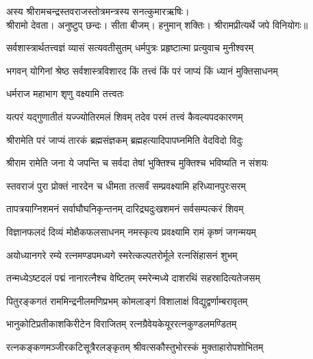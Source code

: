 
अस्य श्रीरामचन्द्रस्तवराजस्तोत्रमन्त्रस्य सनत्कुमारऋषिः। \\
श्रीरामो देवता। अनुष्टुप् छन्दः। सीता बीजम्। हनुमान् शक्तिः। 
श्रीरामप्रीत्यर्थे जपे विनियोगः॥


\twolineshloka
{सर्वशास्त्रार्थतत्त्वज्ञं व्यासं सत्यवतीसुतम्}
{धर्मपुत्रः प्रहृष्टात्मा प्रत्युवाच मुनीश्वरम्}%


\twolineshloka
{भगवन् योगिनां श्रेष्ठ सर्वशास्त्रविशारद}
{किं तत्त्वं किं परं जाप्यं किं ध्यानं मुक्तिसाधनम्}%


\onelineshloka
{धर्मराज महाभाग शृणु वक्ष्यामि तत्त्वतः}%

\twolineshloka
{यत्परं यद्गुणातीतं यज्ज्योतिरमलं शिवम्}
{तदेव परमं तत्त्वं कैवल्यपदकारणम्}%

\twolineshloka
{श्रीरामेति परं जाप्यं तारकं ब्रह्मसंज्ञकम्}
{ब्रह्महत्यादिपापघ्नमिति वेदविदो विदुः}%

\twolineshloka
{श्रीराम रामेति जना ये जपन्ति च सर्वदा}
{तेषां भुक्तिश्च मुक्तिश्च भविष्यति न संशयः}%

\twolineshloka
{स्तवराजं पुरा प्रोक्तं नारदेन च धीमता}
{तत्सर्वं सम्प्रवक्ष्यामि हरिध्यानपुरःसरम्}%

\twolineshloka
{तापत्रयाग्निशमनं सर्वाघौघनिकृन्तनम्}
{दारिद्र्यदुःखशमनं सर्वसम्पत्करं शिवम्}%

\twolineshloka
{विज्ञानफलदं दिव्यं मोक्षैकफलसाधनम्}
{नमस्कृत्य प्रवक्ष्यामि रामं कृष्णं जगन्मयम्}%

\twolineshloka
{अयोध्यानगरे रम्ये रत्नमण्डपमध्यगे}
{स्मरेत्कल्पतरोर्मूले रत्नसिंहासनं शुभम्}%

\twolineshloka
{तन्मध्येऽष्टदलं पद्मं नानारत्नैश्च वेष्टितम्}
{स्मरेन्मध्ये दाशरथिं सहस्रादित्यतेजसम्}%

\twolineshloka
{पितुरङ्कगतं राममिन्द्रनीलमणिप्रभम्}
{कोमलाङ्गं विशालाक्षं विद्युद्वर्णाम्बरावृतम्}%

\twolineshloka
{भानुकोटिप्रतीकाशकिरीटेन विराजितम्}
{रत्नग्रैवेयकेयूररत्नकुण्डलमण्डितम्}%

\twolineshloka
{रत्नकङ्कणमञ्जीरकटिसूत्रैरलङ्कृतम्}
{श्रीवत्सकौस्तुभोरस्कं मुक्ताहारोपशोभितम्}%


